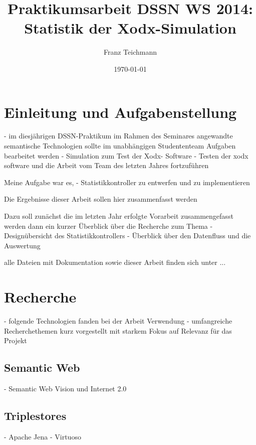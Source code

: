 \documentclass{article}
\title{Praktikumsarbeit DSSN WS 2014: \\ Statistik der Xodx-Simulation}
\author{Franz Teichmann}
\date{\today}
\begin{document}
\maketitle

\tableofcontents
\newpage


\section{Einleitung und Aufgabenstellung}

- im diesjährigen DSSN-Praktikum im Rahmen des Seminares angewandte semantische Technologien sollte im unabhängigen Studententeam
Aufgaben bearbeitet werden
- Simulation zum Test der Xodx- Software
- Testen der xodx software und die Arbeit vom Team des letzten Jahres fortzuführen

Meine Aufgabe war es, 
- Statistikkontroller zu entwerfen und zu implementieren

Die Ergebnisse dieser Arbeit sollen hier zusammenfasst werden

Dazu soll zunächst die im letzten Jahr erfolgte Vorarbeit zusammengefasst werden
dann ein kurzer Überblick über die Recherche zum Thema
- Designübersicht des Statistikkontrollers
- Überblick über den Datenfluss und die Auswertung

alle Dateien mit Dokumentation sowie dieser Arbeit finden sich unter ...



\section{Recherche}

- folgende Technologien fanden bei der Arbeit Verwendung
- umfangreiche Recherchethemen kurz vorgestellt mit starkem Fokus auf Relevanz für das Projekt

\subsection{Semantic Web}

- Semantic Web Vision und Internet 2.0


\subsection{Triplestores}

- Apache Jena
- Virtuoso
\end{document}
